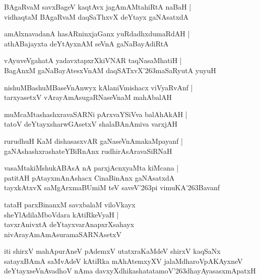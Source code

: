 \documentclass[twoside,12pt,openright]{book}
\def\S{\char'263}
\newcounter{shloka}[chapter]
\begin{document}
\begin{shloka}%
BAgaRvaM savxBageV kaqtAvx jagAmAMtahiRtA naBaH |\\
vidhaqtaM BAgaRvaM daqSaThxvX deYtayx gaNAsatxdA 
\end{shloka}

\begin{shloka}%
amAlxnavadanA hasARninxjaGanx yuRdadhxdumaRdAH |\\
athABajayxta deYtAyxnAM seVnA gaNaBayAdiRtA 
\end{shloka}

\begin{shloka}%
vAyuveVgahatA yadavxtapxrXkiVNAR taqNasaMhatiH |\\
BagAnxM gaNaBayAtesxVnAM daqSATxvX\S maSaRyutA yuyuH 
\end{shloka}

\begin{shloka}%
nishuMBashuMBaseVnAnwyx kAlaniVmishacx viVyaRvAnf |\\
tarxyasetxV vArayAmAsugaRNaseVnaM mahAbalAH 
\end{shloka}

\begin{shloka}%
muMcaMtashashxravaSARNi pArxvaYSiVva balAhAkAH |\\
tatoV deYtayxsharwGAsetxV shalaBAnAmiva varxjAH 
\end{shloka}

\begin{shloka}%
rurudhuH KaM dishasasxvAR gaNaseVnAmakaMpayanf |\\
gaNAshashxrashateYBiRnAnx rudhirAsAravaSiRNaH 
\end{shloka}

\begin{shloka}%
vasaMtakiMshukABAsA nA parxjAcnxyaMta kiMcana |\\
patitAH pAtayxmAnAshacx CinaBinAnx gaNAsatxdA \\
tayxkAtxvX saMgArxmaBUmiM teV saveV\S pi vimuKA\S Bavanf 
\end{shloka}

\begin{shloka}%
tataH parxBinanxM savxbalaM viloVkayx \\
sheYlAdilaMboVdara kAtiRkeVyaH |\\
tavxrAnivxtA deYtayxvarAnapxrXsahayx \\
nivArayAmAmAsuramaSARNAsetxV 
\end{shloka}

\begin{center}
iti shirxV mahApurAneV pAdemxV utatxraKaMdeV shirxV kaqSaNx satayxBAmA saMvAdeV kAtiRka 
mAhAtemxyXV jalaMdharoVpAKAyxneV deYtayxseVnAvadhoV nAma davxyXdhikashatatamoV\S dhayAyasasxmApatxH 
\end{center}
\end{document}
